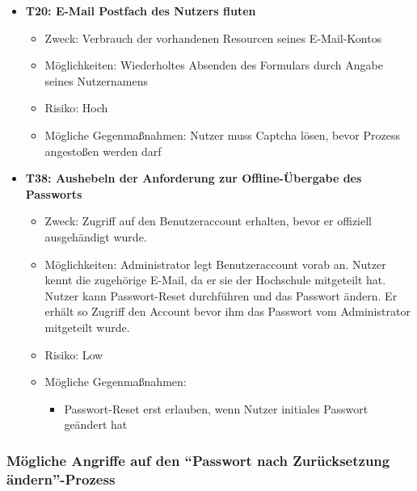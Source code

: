 \documentclass[12pt,DIV14,BCOR10mm,a4paper,parskip=half-,headsepline,headinclude,english,ngerman,bibliography=totocnumbered]{scrreprt}
\begin{document}
\begin{itemize}
  \hypertarget{threat20}{}
  \item \textbf{T20: E-Mail Postfach des Nutzers fluten}
  \begin{itemize}
  \item Zweck: Verbrauch der vorhandenen Resourcen seines E-Mail-Kontos
  \item Möglichkeiten: Wiederholtes Absenden des Formulars durch Angabe seines Nutzernamens
  \item Risiko: Hoch
  \item Mögliche Gegenmaßnahmen: Nutzer muss Captcha lösen, bevor Prozess angestoßen werden darf
  \end{itemize}
  
  \hypertarget{threat38}{}
  \item \textbf{T38: Aushebeln der Anforderung zur Offline-Übergabe des Passworts}
  \begin{itemize}
  \item Zweck: Zugriff auf den Benutzeraccount erhalten, bevor er offiziell ausgehändigt wurde.
  \item Möglichkeiten: Administrator legt Benutzeraccount vorab an. Nutzer kennt die zugehörige E-Mail, da er sie der Hochschule mitgeteilt hat. Nutzer kann Passwort-Reset durchführen und das Passwort ändern. Er erhält so Zugriff den Account bevor ihm das Passwort vom Administrator mitgeteilt wurde.
  \item Risiko: Low
  \item Mögliche Gegenmaßnahmen:
  \begin{itemize}
	  \item Passwort-Reset erst erlauben, wenn Nutzer initiales Passwort geändert hat
  \end{itemize}
\end{itemize}
\end{itemize}

\subsubsection{Mögliche Angriffe auf den \enquote{Passwort nach Zurücksetzung ändern}-Prozess}
\end{document}
